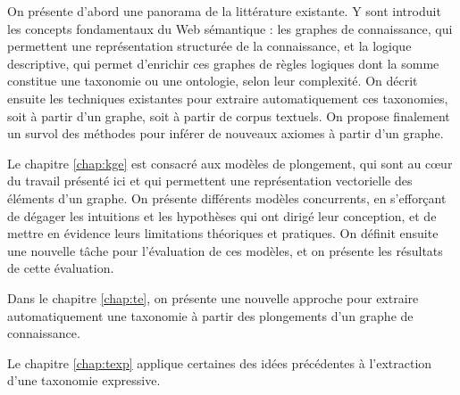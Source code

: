 On présente d'abord une panorama de la littérature existante. Y sont introduit les concepts fondamentaux du Web sémantique : les graphes de connaissance, qui permettent une représentation structurée de la connaissance, et la logique descriptive, qui permet d'enrichir ces graphes de règles logiques dont la somme constitue une taxonomie ou une ontologie, selon leur complexité. On décrit ensuite les techniques existantes pour extraire automatiquement ces taxonomies, soit à partir d'un graphe, soit à partir de corpus textuels. On propose finalement un survol des méthodes pour inférer de nouveaux axiomes à partir d'un graphe.

Le chapitre \ref{chap:kge} est consacré aux modèles de plongement, qui sont au cœur du travail présenté ici et qui permettent une représentation vectorielle des éléments d'un graphe. On présente différents modèles concurrents, en s'efforçant de dégager les intuitions et les hypothèses qui ont dirigé leur conception, et de mettre en évidence leurs limitations théoriques et pratiques. On définit ensuite une nouvelle tâche pour l'évaluation de ces modèles, et on présente les résultats de cette évaluation.

Dans le chapitre \ref{chap:te}, on présente une nouvelle approche pour extraire automatiquement une taxonomie à partir des plongements d'un graphe de connaissance.

Le chapitre \ref{chap:texp} applique certaines des idées précédentes à l'extraction d'une taxonomie expressive. 
\clearpage
